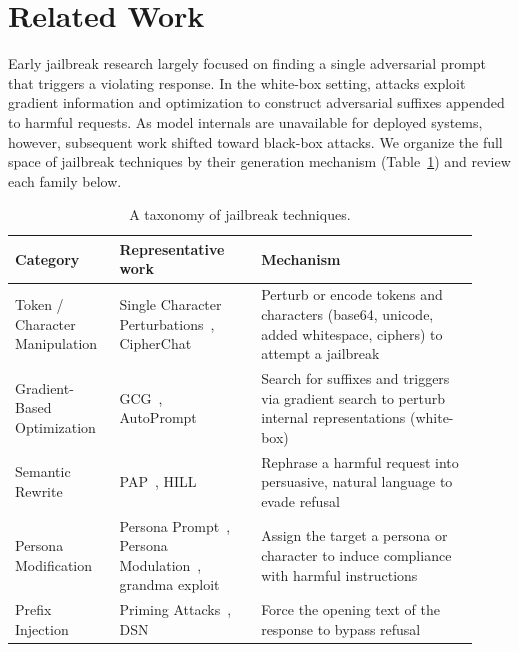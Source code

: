 \section{Related Work}
\label{sec:related}

Early jailbreak research largely focused on finding a single adversarial prompt that triggers a violating response.
In the white-box setting, attacks exploit gradient information and optimization to construct adversarial suffixes appended to harmful requests.
As model internals are unavailable for deployed systems, however, subsequent work shifted toward black-box attacks.
We organize the full space of jailbreak techniques by their generation mechanism (Table~\ref{tab:taxonomy}) and review each family below.

\begin{table}[htbp]
      \centering
      \caption{A taxonomy of jailbreak techniques.}
      \label{tab:taxonomy}
      \footnotesize
      \begin{tabular}{@{}>{\raggedright\arraybackslash}p{0.20\linewidth}>{\raggedright\arraybackslash}p{0.29\linewidth}p{0.43\linewidth}@{}}
            \toprule
            \textbf{Category} & \textbf{Representative work} & \textbf{Mechanism} \\
            \midrule
            Token / Character Manipulation    & Single Character Perturbations~\cite{scp}, CipherChat~\cite{cipherchat}                       & Perturb or encode tokens and characters (base64, unicode, added whitespace, ciphers) to attempt a jailbreak \\
            \midrule
            Gradient-Based Optimization       & GCG~\cite{gcg}, AutoPrompt~\cite{autoprompt}                                                  & Search for suffixes and triggers via gradient search to perturb internal representations (white-box)        \\
            \midrule
            Semantic Rewrite                  & PAP~\cite{pap}, HILL~\cite{hill}                                                              & Rephrase a harmful request into persuasive, natural language to evade refusal                               \\
            \midrule
            Persona Modification              & Persona Prompt~\cite{personaprompts}, Persona Modulation~\cite{personamod}, grandma exploit   & Assign the target a persona or character to induce compliance with harmful instructions                     \\
            \midrule
            Prefix Injection                  & Priming Attacks~\cite{priming}, DSN~\cite{dsn}                                                & Force the opening text of the response to bypass refusal                                                    \\

\end{tabular}
\end{table}
